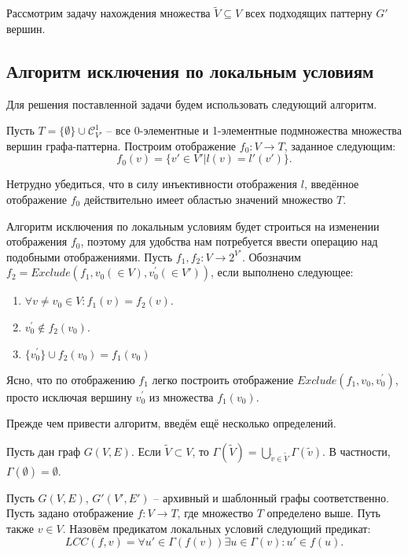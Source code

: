 Рассмотрим задачу нахождения множества $\widetilde{V} \subseteq V$ всех подходящих паттерну $G'$ вершин.

\subsection{Алгоритм исключения по локальным условиям}

Для решения поставленной задачи будем использовать следующий алгоритм.

Пусть $T = \{\emptyset\} \cup \mathcal{C}_{V'}^1$ -- все 0-элементные и 1-элементные подмножества множества вершин графа-паттерна. Построим отображение $f_0 : V \to T$, заданное следующим:
\begin{equation}
f_0(v) = \{v' \in V' | l(v) = l'(v')\} .
\end{equation}

Нетрудно убедиться, что в силу инъективности отображения $l$, введённое отображение $f_0$ действительно имеет областью значений множество $T$.

Алгоритм исключения по локальным условиям будет строиться на изменении отображения $f_0$, поэтому для удобства нам потребуется ввести операцию над подобными отображениями. Пусть $f_1, f_2 : V \to 2^{V'}$. Обозначим $f_2 = Exclude(f_1,\allowbreak v_0 (\in V), \allowbreak v^{\prime}_0 (\in V'))$, если выполнено следующее:
\begin{enumerate}
	\item $\forall v \ne v_0 \in V: f_1(v) = f_2(v)$.
	\item $v^{\prime}_0 \notin f_2(v_0)$.
	\item $\{v^{\prime}_0\} \cup f_2(v_0) = f_1(v_0)$
\end{enumerate}

Ясно, что по отображению $f_1$ легко построить отображение $Exclude(f_1,\allowbreak v_0,\allowbreak v^{\prime}_0)$, просто исключая вершину $v^{\prime}_0$ из множества $f_1(v_0)$.

Прежде чем привести алгоритм, введём ещё несколько определений.

\begin{defn}
	Пусть дан граф $G(V, E)$. Если $\widetilde{V} \subset V$, то $\Gamma(\widetilde{V}) = \bigcup\limits_{\widetilde{v} \in \widetilde{V}} \Gamma(\widetilde{v})$. В частности, $\Gamma(\emptyset) = \emptyset$.
\end{defn} 

\begin{defn}
	Пусть $G(V, E)$, $G'(V', E')$ -- архивный и шаблонный графы соответственно. Пусть задано отображение $f : V \to T$, где множество $T$ определено выше. Путь также $v \in V$. Назовём предикатом локальных условий следующий предикат:
	\begin{equation}
		LCC(f, v) = \forall u' \in \Gamma(f(v)) \exists u \in \Gamma(v) : u' \in f(u).
	\end{equation} 
\end{defn} 

